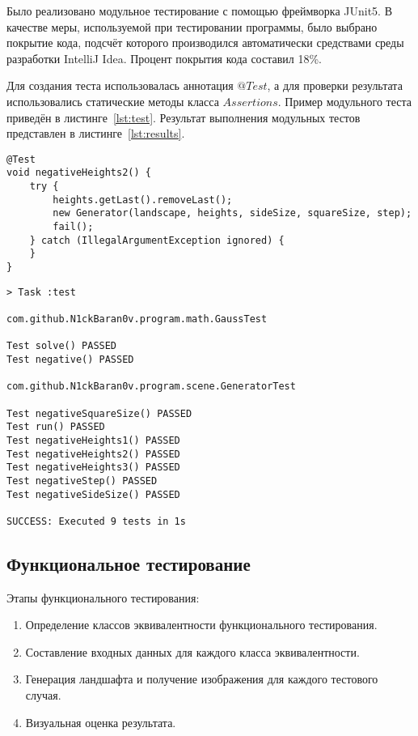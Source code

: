 Было реализовано модульное тестирование с помощью фреймворка JUnit5. В качестве меры, используемой при тестировании программы, было выбрано покрытие кода, подсчёт которого производился автоматически средствами среды разработки IntelliJ Idea. Процент покрытия кода составил 18\%.

Для создания теста использовалась аннотация $@Test$, а для проверки результата использовались статические методы класса $Assertions$. Пример модульного теста приведён в листинге~\ref{lst:test}.
Результат выполнения модульных тестов представлен в листинге~\ref{lst:results}.

\begin{lstlisting}[label=lst:test,caption=Пример модульного теста]
@Test
void negativeHeights2() {
	try {
		heights.getLast().removeLast();
		new Generator(landscape, heights, sideSize, squareSize, step);
		fail();
	} catch (IllegalArgumentException ignored) {
	}
}
\end{lstlisting}

\begin{lstlisting}[label=lst:results,caption=Результат выполнения модульных тестов]
> Task :test

com.github.N1ckBaran0v.program.math.GaussTest

Test solve() PASSED
Test negative() PASSED

com.github.N1ckBaran0v.program.scene.GeneratorTest

Test negativeSquareSize() PASSED
Test run() PASSED
Test negativeHeights1() PASSED
Test negativeHeights2() PASSED
Test negativeHeights3() PASSED
Test negativeStep() PASSED
Test negativeSideSize() PASSED

SUCCESS: Executed 9 tests in 1s

\end{lstlisting}

\subsection{Функциональное тестирование}

Этапы функционального тестирования:

\begin{enumerate}[label=\arabic*.]
	\item Определение классов эквивалентности функционального тестирования.
	\item Составление входных данных для каждого класса эквивалентности.
	\item Генерация ландшафта и получение изображения для каждого тестового случая.
	\item Визуальная оценка результата.
\end{enumerate}

